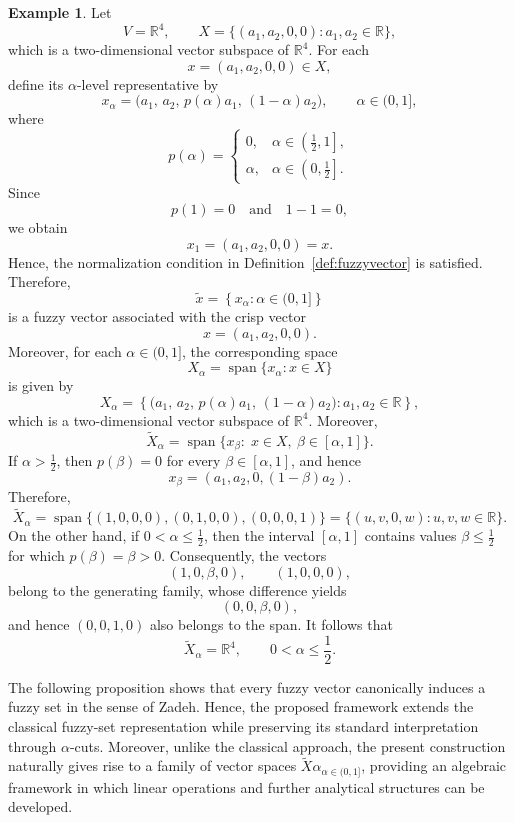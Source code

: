 \documentclass[preprint,12pt]{elsarticle}
\theoremstyle{definition}
\newtheorem{example}[theorem]{Example}
\begin{document}
\begin{example} Let \[ V=\mathbb{R}^4, \qquad X=\{(a_1,a_2,0,0):a_1,a_2\in\mathbb{R}\}, \] which is a two-dimensional vector subspace of $\mathbb{R}^4$. For each \[ x=(a_1,a_2,0,0)\in X, \] define its $\alpha$-level representative by \[ x_\alpha = \bigl(a_1,\, a_2,\, p(\alpha)a_1,\, (1-\alpha)a_2 \bigr), \qquad \alpha\in(0,1], \] where \[ p(\alpha)= \begin{cases} 0, & \alpha\in\left(\frac12,1\right],\\[2mm] \alpha, & \alpha\in\left(0,\frac12\right]. \end{cases} \] Since \[ p(1)=0 \quad\text{and}\quad 1-1=0, \] we obtain \[ x_1=(a_1,a_2,0,0)=x. \] Hence, the normalization condition in Definition~\ref{def:fuzzyvector} is satisfied. Therefore, \[ \widetilde{x} = \left\{x_\alpha:\alpha\in(0,1]\right\} \] is a fuzzy vector associated with the crisp vector \[ x=(a_1,a_2,0,0). \] Moreover, for each $\alpha\in(0,1]$, the corresponding space \[ X_\alpha = \operatorname{span} \{x_\alpha:x\in X\} \] is given by \[ X_\alpha = \left\{ \bigl(a_1,\, a_2,\, p(\alpha)a_1,\, (1-\alpha)a_2 \bigr): a_1,a_2\in\mathbb{R} \right\}, \] which is a two-dimensional vector subspace of $\mathbb{R}^4$.
Moreover, \[ \widetilde{X}_\alpha = \operatorname{span} \{x_\beta:\;x\in X,\ \beta\in[\alpha,1]\}. \] If $\alpha>\frac12$, then $p(\beta)=0$ for every $\beta\in[\alpha,1]$, and hence \[ x_\beta = (a_1,a_2,0,(1-\beta)a_2). \] Therefore, \[ \widetilde{X}_\alpha = \operatorname{span} \{(1,0,0,0),(0,1,0,0),(0,0,0,1)\} = \{(u,v,0,w):u,v,w\in\mathbb{R}\}. \] On the other hand, if $0<\alpha\le\frac12$, then the interval $[\alpha,1]$ contains values $\beta\le\frac12$ for which $p(\beta)=\beta>0$. Consequently, the vectors \[ (1,0,\beta,0), \qquad (1,0,0,0), \] belong to the generating family, whose difference yields \[ (0,0,\beta,0), \] and hence $(0,0,1,0)$ also belongs to the span. It follows that \[ \widetilde{X}_\alpha = \mathbb{R}^4, \qquad 0<\alpha\le\frac12. \]
 \end{example}
 The following proposition shows that every fuzzy vector canonically induces a fuzzy set in the sense of Zadeh. Hence, the proposed framework extends the classical fuzzy-set representation while preserving its standard interpretation through $\alpha$-cuts. Moreover, unlike the classical approach, the present construction naturally gives rise to a family of vector spaces ${\widetilde{X}\alpha}_{\alpha\in(0,1]}$, providing an algebraic framework in which linear operations and further analytical structures can be developed.
\end{document}
